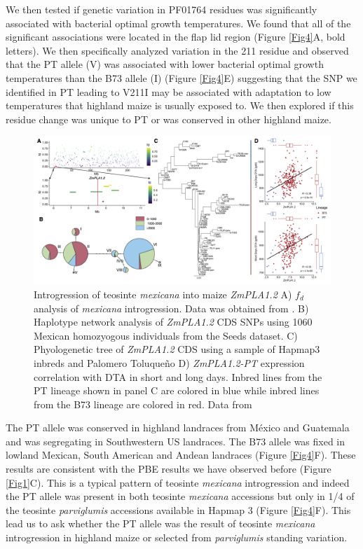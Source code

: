 \documentclass[9pt,twocolumn,twoside,lineno]{BioRxiv}
\begin{document}
We then tested if genetic variation in PF01764 residues was significantly associated with bacterial optimal growth temperatures. 
We found that all of the significant associations were located in the flap lid region  (Figure \ref{Fig4}A, bold letters).  
We then specifically analyzed variation in the 211 residue and observed that the PT allele (V) was associated with lower bacterial optimal growth temperatures than the B73 allele (I) (Figure \ref{Fig4}E) suggesting that the SNP we identified in PT leading to V211I may be associated with adaptation to low temperatures that highland maize is usually exposed to. 
We then explored if this residue change was unique to PT or was conserved in other highland maize.
\begin{figure}[!ht]
\begin{center}
\includegraphics[width=0.8\paperwidth]{Figures/Fig_5.png}
\caption{Introgression of teosinte \textit{mexicana} into maize \textit{ZmPLA1.2}  
A) \(f_d\) analysis of \textit{mexicana} introgression. Data was obtained from \cite{Gonzalez-Segovia2019-jy}. 
B) Haplotype network analysis of \textit{ZmPLA1.2} CDS SNPs using 1060 Mexican homozyogous individuals from the Seeds dataset.
C) Phyologenetic tree of \textit{ZmPLA1.2} CDS using a sample of Hapmap3 inbreds and Palomero Toluqueño
D) \textit{ZmPLA1.2-PT} expression correlation with DTA in short and long days. Inbred lines from the PT lineage shown in panel C are colored in blue while inbred lines from the B73 lineage are colored in red.
Data from \cite{Kremling2018-gn}}
\label{Fig5}
\end{center}
\end{figure} 
The PT allele was conserved in highland landraces from México and Guatemala and was segregating in Southwestern US landraces. 
The B73 allele was fixed in lowland Mexican, South American and Andean landraces (Figure \ref{Fig4}F). 
These results are consistent with the PBE results we have observed before (Figure \ref{Fig1}C).
This is a typical pattern of teosinte \textit{mexicana} introgression \cite{Wang2020-mp} and indeed the PT allele was present in both teosinte \textit{mexicana} accessions but only in 1/4 of the teosinte \textit{parviglumis} accessions available in Hapmap 3 \cite{Bukowski2017-ng} (Figure \ref{Fig4}F). 
This lead us to ask whether the PT allele was the result of teosinte \textit{mexicana} introgression in highland maize or selected from \textit{parviglumis} standing variation. 
\end{document}
